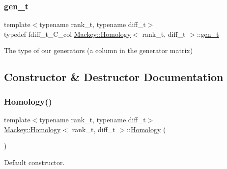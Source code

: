 \mbox{\label{classMackey_1_1Homology_adf81f4293a5feba94aa734fcc8c89a46}} 
\subsubsection{\texorpdfstring{gen\+\_\+t}{gen\_t}}
{\footnotesize\ttfamily template$<$typename rank\+\_\+t, typename diff\+\_\+t$>$ \\
typedef fdiff\+\_\+t\+\_\+\+C\+\_\+col \hyperlink{classMackey_1_1Homology}{Mackey\+::\+Homology}$<$ rank\+\_\+t, diff\+\_\+t $>$\+::\hyperlink{classMackey_1_1Homology_adf81f4293a5feba94aa734fcc8c89a46}{gen\+\_\+t}}



The type of our generators (a column in the generator matrix) 



\subsection{Constructor \& Destructor Documentation}
\mbox{\label{classMackey_1_1Homology_a3580b194f986bd59a02fb84db97e00f2}} 
\subsubsection{\texorpdfstring{Homology()}{Homology()}\hspace{0.1cm}{\footnotesize\ttfamily [1/3]}}
{\footnotesize\ttfamily template$<$typename rank\+\_\+t, typename diff\+\_\+t$>$ \\
\hyperlink{classMackey_1_1Homology}{Mackey\+::\+Homology}$<$ rank\+\_\+t, diff\+\_\+t $>$\+::\hyperlink{classMackey_1_1Homology}{Homology} (\begin{DoxyParamCaption}{ }\end{DoxyParamCaption})\hspace{0.3cm}{\ttfamily [inline]}}



Default constructor. 

